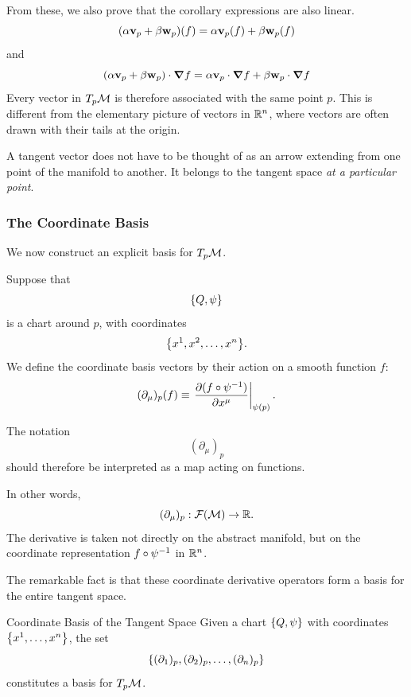 		From these, we also prove that the corollary expressions are also linear.
		\[
			(\alpha \vb{v}_p + \beta \vb{w}_p) (f) = \alpha \vb{v}_p (f) + \beta \vb{w}_p (f)
		\]
		and
		\[
			(\alpha \vb{v}_p + \beta \vb{w}_p)\cdot\grad f
			=
			\alpha \vb{v}_p \cdot \grad f + \beta \vb{w}_p \cdot \grad f
		\]
		Every vector in $T_p\mathcal{M}$ is therefore associated with the same
		point $p$. This is different from the elementary picture of vectors
		in $\mathbb{R}^n$, where vectors are often drawn with their tails at the
		origin.

		A tangent vector does not have to be thought of as an arrow extending
		from one point of the manifold to another. It belongs to the tangent
		space \textit{at a particular point}.

	\subsubsection{The Coordinate Basis}
		We now construct an explicit basis for $T_p\mathcal{M}$.

		Suppose that
		\[
		    \qty{Q,\psi}
		\]
		is a chart around $p$, with coordinates
		\[
		    \qty{x^1,x^2,\ldots,x^n}.
		\]
		We define the coordinate basis vectors by their action on a smooth
		function $f$:
		\begin{equation}
			(\partial_\mu)_p(f)
			\equiv
			\eval{
			\pdv{(f\circ\psi^{-1})}{x^\mu}
			}_{\psi(p)}.
			\label{eq:coordinate-basis-definition}
		\end{equation}

		The notation
		\[
		    (\partial_\mu)_p
		\]
		should therefore be interpreted as a map acting on functions.

		In other words,
		\[
		    (\partial_\mu)_p
		    :
		    \mathcal{F}(\mathcal{M})\to\mathbb{R}.
		\]
		The derivative is taken not directly on the abstract manifold, but
		on the coordinate representation
		$f\circ\psi^{-1}$ in $\mathbb{R}^n$.

		The remarkable fact is that these coordinate derivative operators
		form a basis for the entire tangent space.

		\begin{theorem}{Coordinate Basis of the Tangent Space}
			Given a chart $\qty{Q,\psi}$ with coordinates
			$\qty{x^1,\ldots,x^n}$, the set
			\begin{equation}
			\qty{
			(\partial_1)_p,
			(\partial_2)_p,
			\ldots,
			(\partial_n)_p
			}
			\label{eq:coordinate-basis-set}
		\end{equation}
		constitutes a basis for $T_p\mathcal{M}$.
		\end{theorem}

